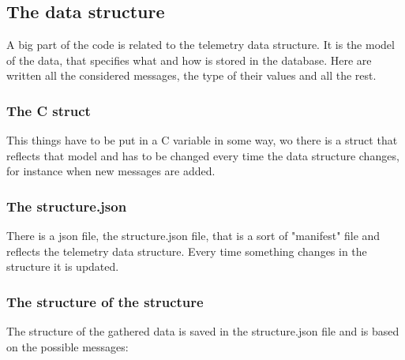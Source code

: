 \subsection{The data structure}

A big part of the code is related to the telemetry data structure. It is the model of the data, that specifies what and how is stored in the database.
Here are written all the considered messages, the type of their values and all the rest. 

\subsubsection{The C struct}

This things have to be put in a C variable in some way, wo there is a struct that reflects that model and has to be changed every time the 
data structure changes, for instance when new messages are added.

\subsubsection{The structure.json}

There is a json file, the structure.json file, that is a sort of "manifest" file and reflects the telemetry data structure. Every time something
changes in the structure it is updated.

\subsubsection{The structure of the structure}

The structure of the gathered data is saved in the structure.json file and is based on the possible messages:

